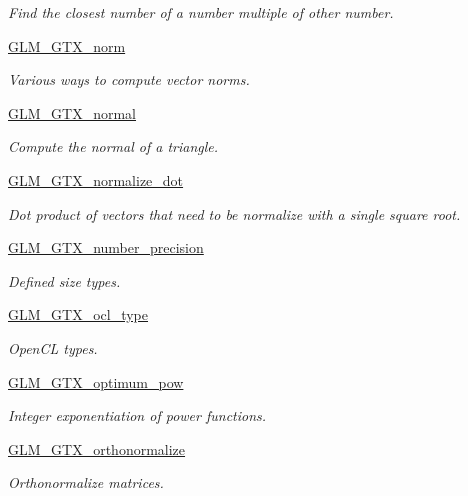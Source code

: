 \begin{DoxyCompactItemize}
\begin{DoxyCompactList}\small\item\em Find the closest number of a number multiple of other number. \end{DoxyCompactList}\item 
\hyperlink{group__gtx__norm}{G\+L\+M\+\_\+\+G\+T\+X\+\_\+norm}
\begin{DoxyCompactList}\small\item\em Various ways to compute vector norms. \end{DoxyCompactList}\item 
\hyperlink{group__gtx__normal}{G\+L\+M\+\_\+\+G\+T\+X\+\_\+normal}
\begin{DoxyCompactList}\small\item\em Compute the normal of a triangle. \end{DoxyCompactList}\item 
\hyperlink{group__gtx__normalize__dot}{G\+L\+M\+\_\+\+G\+T\+X\+\_\+normalize\+\_\+dot}
\begin{DoxyCompactList}\small\item\em Dot product of vectors that need to be normalize with a single square root. \end{DoxyCompactList}\item 
\hyperlink{group__gtx__number__precision}{G\+L\+M\+\_\+\+G\+T\+X\+\_\+number\+\_\+precision}
\begin{DoxyCompactList}\small\item\em Defined size types. \end{DoxyCompactList}\item 
\hyperlink{group__gtx__ocl__type}{G\+L\+M\+\_\+\+G\+T\+X\+\_\+ocl\+\_\+type}
\begin{DoxyCompactList}\small\item\em Open\+C\+L types. \end{DoxyCompactList}\item 
\hyperlink{group__gtx__optimum__pow}{G\+L\+M\+\_\+\+G\+T\+X\+\_\+optimum\+\_\+pow}
\begin{DoxyCompactList}\small\item\em Integer exponentiation of power functions. \end{DoxyCompactList}\item 
\hyperlink{group__gtx__orthonormalize}{G\+L\+M\+\_\+\+G\+T\+X\+\_\+orthonormalize}
\begin{DoxyCompactList}\small\item\em Orthonormalize matrices. \end{DoxyCompactList}\item 

\end{DoxyCompactItemize}
